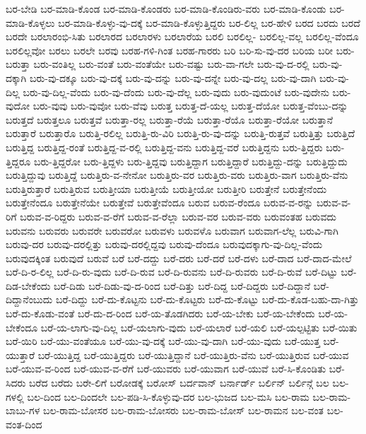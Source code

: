 {ಬರ-ಬೇಡಿ
ಬರ-ಮಾಡಿ-ಕೊಂಡ
ಬರ-ಮಾಡಿ-ಕೊಂಡರು
ಬರ-ಮಾಡಿ-ಕೊಂಡಿರು-ವರು
ಬರ-ಮಾಡಿ-ಕೊಂಡು
ಬರ-ಮಾಡಿ-ಕೊಳ್ಳಲು
ಬರ-ಮಾಡಿ-ಕೊಳ್ಳು-ವು-ದಕ್ಕೆ
ಬರ-ಮಾಡಿ-ಕೊಳ್ಳುತ್ತಿದ್ದರು
ಬರ-ಲಿಲ್ಲ
ಬರ-ಹೇಳಿ
ಬರದ
ಬರದು
ಬರದೆ
ಬರದೇ
ಬರಲಾರಂಭಿ-ಸಿತು
ಬರಲಾರದ
ಬರಲಾರಳು
ಬರಲಾರೆಯ
ಬರಲಿ
ಬರಲಿಲ್ಲ-
ಬರಲಿಲ್ಲ-ವಲ್ಲ
ಬರಲಿಲ್ಲ-ವೆಂದೂ
ಬರಲಿಲ್ಲವೋ
ಬರಲು
ಬರಲೇ
ಬರವು
ಬರಹ-ಗಳಿ-ಗಿಂತ
ಬರಹ-ಗಾರರು
ಬರಿ
ಬರಿ-ಸು-ವು-ದರ
ಬರಿಯ
ಬರೀ
ಬರು-ಬರುತ್ತಾ
ಬರು-ವಂತಿಲ್ಲ
ಬರು-ವಂತೆ
ಬರು-ವಂತೆಯೇ
ಬರು-ವಷ್ಟು
ಬರು-ವಾ-ಗಲೇ
ಬರು-ವು-ದ-ರಲ್ಲಿ
ಬರು-ವು-ದಕ್ಕಾಗಿ
ಬರು-ವು-ದಕ್ಕೂ
ಬರು-ವು-ದಕ್ಕೆ
ಬರು-ವು-ದನ್ನು
ಬರು-ವು-ದನ್ನೇ
ಬರು-ವು-ದಲ್ಲ
ಬರು-ವು-ದಾಗಿ
ಬರು-ವು-ದಿಲ್ಲ
ಬರು-ವು-ದಿಲ್ಲ-ವೆಂದು
ಬರು-ವು-ದೆಂದು
ಬರು-ವು-ದೆಲ್ಲ
ಬರು-ವುದು
ಬರು-ವುದುಂಟೆ
ಬರು-ವುದೇನು
ಬರು-ವುದೋ
ಬರು-ವುವು
ಬರು-ವುವೋ
ಬರು-ವೆವು
ಬರುತ್ತ
ಬರುತ್ತ-ದೆ-ಯಲ್ಲ
ಬರುತ್ತ-ದೆಯೋ
ಬರುತ್ತ-ವೆಂಬು-ದನ್ನು
ಬರುತ್ತದೆ
ಬರುತ್ತಲೂ
ಬರುತ್ತವೆ
ಬರುತ್ತಾ-ರಲ್ಲ
ಬರುತ್ತಾ-ರೆಯೆ
ಬರುತ್ತಾ-ರೆಯೊ
ಬರುತ್ತಾ-ರೆಯೋ
ಬರುತ್ತಾನೆ
ಬರುತ್ತಾರೆ
ಬರುತ್ತಾರೊ
ಬರುತ್ತಿ-ರಲಿಲ್ಲ
ಬರುತ್ತಿ-ರು-ವಿರಿ
ಬರುತ್ತಿ-ರು-ವು-ದನ್ನು
ಬರುತ್ತಿ-ರುತ್ತವೆ
ಬರುತ್ತಿತ್ತು
ಬರುತ್ತಿದೆ
ಬರುತ್ತಿದ್ದ
ಬರುತ್ತಿದ್ದ-ರಂತೆ
ಬರುತ್ತಿದ್ದ-ವ-ರಲ್ಲಿ
ಬರುತ್ತಿದ್ದ-ವನು
ಬರುತ್ತಿದ್ದ-ವರೆ
ಬರುತ್ತಿದ್ದನು
ಬರು-ತ್ತಿದ್ದರು
ಬರು-ತ್ತಿದ್ದರೂ
ಬರು-ತ್ತಿದ್ದರೋ
ಬರು-ತ್ತಿದ್ದಳು
ಬರು-ತ್ತಿದ್ದವು
ಬರುತ್ತಿದ್ದಾಗ
ಬರುತ್ತಿದ್ದಾರೆ
ಬರುತ್ತಿದ್ದು-ದನ್ನು
ಬರುತ್ತಿದ್ದುದು
ಬರುತ್ತಿದ್ದುವು
ಬರುತ್ತಿದ್ದೆ
ಬರುತ್ತಿರು-ವ-ನೇನೋ
ಬರುತ್ತಿರು-ವರ
ಬರುತ್ತಿರು-ವರು
ಬರುತ್ತಿರು-ವಾಗ
ಬರುತ್ತಿರು-ವೆನು
ಬರುತ್ತಿರುತ್ತಾರೆ
ಬರುತ್ತಿರುವ
ಬರುತ್ತೀಯಾ
ಬರುತ್ತೀಯೆ
ಬರುತ್ತೀಯೋ
ಬರುತ್ತೀರಿ
ಬರುತ್ತೇನೆ
ಬರುತ್ತೇನೆಂದು
ಬರುತ್ತೇನೆಂದೂ
ಬರುತ್ತೇನೆಯೇ
ಬರುತ್ತೇವೆ
ಬರುತ್ತೇವೆಂದೂ
ಬರುವ
ಬರುವ-ರೆಂದೂ
ಬರುವ-ವ-ರನ್ನು
ಬರುವ-ವ-ರಿಗೆ
ಬರುವ-ವ-ರಿದ್ದರು
ಬರುವ-ವ-ರೆಗೆ
ಬರುವ-ವ-ರೆಲ್ಲಾ
ಬರುವ-ವರ
ಬರುವ-ವರು
ಬರುವಂತಹ
ಬರುವದು
ಬರುವನು
ಬರುವರು
ಬರುವರೇ
ಬರುವರೋ
ಬರುವಳು
ಬರುವಳೊ
ಬರುವಾಗ
ಬರುವಾಗ-ಲೆಲ್ಲ
ಬರುವಿ-ಗಾಗಿ
ಬರುವು-ದರ
ಬರುವು-ದರಲ್ಲಿತ್ತು
ಬರುವು-ದರಲ್ಲಿದ್ದವು
ಬರುವು-ದೆಂದೂ
ಬರುವುದಕ್ಕಾಗು-ವು-ದಿಲ್ಲ-ವೆಂದು
ಬರುವುದಕ್ಕಿಂತ
ಬರುವುದೆ
ಬರುವೆ
ಬರೆ
ಬರೆ-ದದ್ದು
ಬರೆ-ದರು
ಬರೆ-ದರೆ
ಬರೆ-ದಳು
ಬರೆ-ದಾದ
ಬರೆ-ದಾದ-ಮೇಲೆ
ಬರೆ-ದಿ-ರ-ಲಿಲ್ಲ
ಬರೆ-ದಿ-ರು-ವುದು
ಬರೆ-ದಿ-ರುವ
ಬರೆ-ದಿ-ರುವನು
ಬರೆ-ದಿ-ರುವರು
ಬರೆ-ದಿ-ರುವೆ
ಬರೆ-ದಿಟ್ಟು
ಬರೆ-ದಿಡ-ಬೇಕೆಂದು
ಬರೆ-ದಿಡು
ಬರೆ-ದಿಡು-ವು-ದ-ರಿಂದ
ಬರೆ-ದಿತ್ತು
ಬರೆ-ದಿದ್ದ
ಬರೆ-ದಿದ್ದರು
ಬರೆ-ದಿದ್ದಾನೆ
ಬರೆ-ದಿದ್ದಾನೆಂಬುದು
ಬರೆ-ದಿದ್ದು
ಬರೆ-ದು-ಕೊಟ್ಟನು
ಬರೆ-ದು-ಕೊಟ್ಟರು
ಬರೆ-ದು-ಕೊಟ್ಟು
ಬರೆ-ದು-ಕೊಡ-ಬಹು-ದಾ-ಗಿತ್ತು
ಬರೆ-ದು-ಕೊಡು-ವಂತೆ
ಬರೆ-ದು-ದ-ರಿಂದ
ಬರೆ-ಯ-ತೊಡಗಿದರು
ಬರೆ-ಯ-ಬೇಕು
ಬರೆ-ಯ-ಬೇಕೆಂದು
ಬರೆ-ಯ-ಬೇಕೆಂದೂ
ಬರೆ-ಯ-ಲಾಗು-ವು-ದಿಲ್ಲ
ಬರೆ-ಯಲಾಗು-ವುದು
ಬರೆ-ಯಲಾರೆ
ಬರೆ-ಯಲಿ
ಬರೆ-ಯಲ್ಪಟ್ಟಿತು
ಬರೆ-ಯಿತು
ಬರೆ-ಯಿರಿ
ಬರೆ-ಯು-ವಂತೆಯೂ
ಬರೆ-ಯು-ವು-ದಕ್ಕೆ
ಬರೆ-ಯು-ವು-ದಾಗಿ
ಬರೆ-ಯು-ವುದು
ಬರೆ-ಯುತ್ತ
ಬರೆ-ಯುತ್ತಾರೆ
ಬರೆ-ಯುತ್ತಿದ್ದ
ಬರೆ-ಯುತ್ತಿದ್ದರು
ಬರೆ-ಯುತ್ತಿದ್ದಾನೆ
ಬರೆ-ಯುತ್ತಿರು-ವೆನು
ಬರೆ-ಯುತ್ತಿರುವ
ಬರೆ-ಯುವ
ಬರೆ-ಯುವ-ವ-ರಿಂದ
ಬರೆ-ಯುವ-ವ-ರೆಗೆ
ಬರೆ-ಯುವರು
ಬರೆ-ಯುವಾಗ
ಬರೆ-ಯುವೆ
ಬರೆ-ಸಿ-ಕೊಂಡಿತು
ಬರೆ-ಸಿದರು
ಬರೆದ
ಬರೆದು
ಬರೇ-ಲಿಗೆ
ಬರೋಡಕ್ಕೆ
ಬರೋಸ್
ಬರ್ದವಾನ್
ಬರ್ನಾರ್ಡ್
ಬರ್ಲಿನ್
ಬರ್ಲಿನ್ಗೆ
ಬಲ
ಬಲ-ಗಳಲ್ಲಿ
ಬಲ-ದಿಂದ
ಬಲ-ದಿಂದಲೇ
ಬಲ-ಪಡಿ-ಸಿ-ಕೊಳ್ಳುವು-ದರ
ಬಲ-ಭುಜದ
ಬಲ-ಮಸಿ
ಬಲ-ರಾಮ
ಬಲ-ರಾಮ-ಬಾಬು-ಗಳ
ಬಲ-ರಾಮ-ಬೋಸರ
ಬಲ-ರಾಮ-ಬೋಸರು
ಬಲ-ರಾಮ-ಬೋಸ್
ಬಲ-ರಾಮನ
ಬಲ-ವಂತ
ಬಲ-ವಂತ-ದಿಂದ
}
